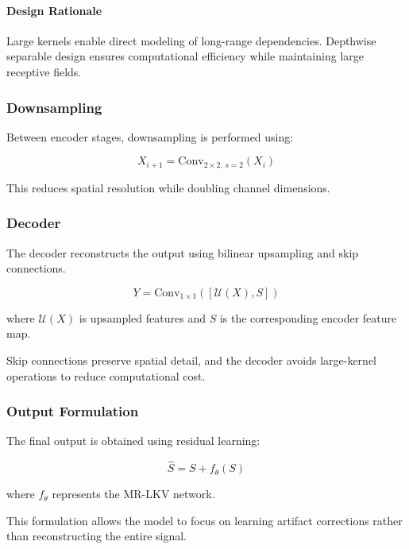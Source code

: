 \paragraph{Design Rationale}

Large kernels enable direct modeling of long-range dependencies. Depthwise separable design ensures computational efficiency while maintaining large receptive fields.

\subsubsection{Downsampling}

Between encoder stages, downsampling is performed using:

\begin{equation}
X_{i+1} =
\mathrm{Conv}_{2\times2,\, s=2}(X_i)
\end{equation}

This reduces spatial resolution while doubling channel dimensions.

\subsubsection{Decoder}

The decoder reconstructs the output using bilinear upsampling and skip connections.

\begin{equation}
Y =
\mathrm{Conv}_{1\times1}\left(
[\mathcal{U}(X), S]
\right)
\end{equation}

where $\mathcal{U}(X)$ is upsampled features and $S$ is the corresponding encoder feature map.

Skip connections preserve spatial detail, and the decoder avoids large-kernel operations to reduce computational cost.

\subsubsection{Output Formulation}

The final output is obtained using residual learning:

\begin{equation}
\hat{S} = S + f_\theta(S)
\end{equation}

where $f_\theta$ represents the MR-LKV network.

This formulation allows the model to focus on learning artifact corrections rather than reconstructing the entire signal.


